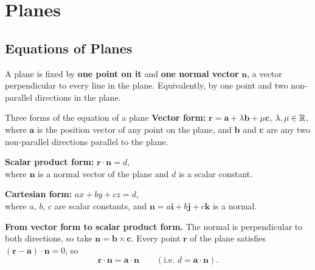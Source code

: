 \clearpage
\section{Planes}
\subsection{Equations of Planes}
A plane is fixed by \textbf{one point on it} and \textbf{one normal vector} $\mathbf{n}$, a vector perpendicular to every line in the plane. Equivalently, by one point and two non-parallel directions in the plane.

\begin{definition}{Three forms of the equation of a plane}
\textbf{Vector form:} \quad $\mathbf{r} = \mathbf{a} + \lambda\mathbf{b} + \mu\mathbf{c}$, \quad $\lambda,\mu\in\mathbb{R}$, \\
where $\mathbf{a}$ is the position vector of any point on the plane, and $\mathbf{b}$ and $\mathbf{c}$ are any two non-parallel directions parallel to the plane.

\textbf{Scalar product form:} \quad $\mathbf{r}\cdot\mathbf{n} = d$, \\
where $\mathbf{n}$ is a normal vector of the plane and $d$ is a scalar constant.

\textbf{Cartesian form:} \quad $ax + by + cz = d$, \\
where $a$, $b$, $c$ are scalar constants, and $\mathbf{n} = a\mathbf{i} + b\mathbf{j} + c\mathbf{k}$ is a normal.
\end{definition}

\begin{info}
\textbf{From vector form to scalar product form.} The normal is perpendicular to both directions, so take $\mathbf{n} = \mathbf{b}\times\mathbf{c}$. Every point $\mathbf{r}$ of the plane satisfies $(\mathbf{r}-\mathbf{a})\cdot\mathbf{n} = 0$, so
\[
\mathbf{r}\cdot\mathbf{n} = \mathbf{a}\cdot\mathbf{n} \qquad (\text{i.e. } d = \mathbf{a}\cdot\mathbf{n}).
\]
\end{info}

